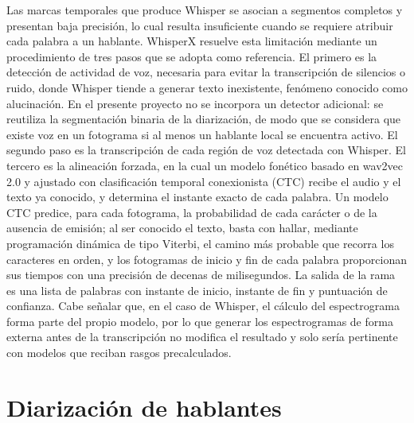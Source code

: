 \documentclass[11pt,a4paper]{article}
\begin{document}
Las marcas temporales que produce Whisper se asocian a segmentos completos y presentan baja precisión, lo cual resulta insuficiente cuando se requiere atribuir cada palabra a un hablante. WhisperX \cite{bain2023} resuelve esta limitación mediante un procedimiento de tres pasos que se adopta como referencia. El primero es la detección de actividad de voz, necesaria para evitar la transcripción de silencios o ruido, donde Whisper tiende a generar texto inexistente, fenómeno conocido como alucinación. En el presente proyecto no se incorpora un detector adicional: se reutiliza la segmentación binaria de la diarización, de modo que se considera que existe voz en un fotograma si al menos un hablante local se encuentra activo. El segundo paso es la transcripción de cada región de voz detectada con Whisper. El tercero es la alineación forzada, en la cual un modelo fonético basado en wav2vec 2.0 \cite{baevski2020} y ajustado con clasificación temporal conexionista (CTC) recibe el audio y el texto ya conocido, y determina el instante exacto de cada palabra. Un modelo CTC predice, para cada fotograma, la probabilidad de cada carácter o de la ausencia de emisión; al ser conocido el texto, basta con hallar, mediante programación dinámica de tipo Viterbi, el camino más probable que recorra los caracteres en orden, y los fotogramas de inicio y fin de cada palabra proporcionan sus tiempos con una precisión de decenas de milisegundos. La salida de la rama es una lista de palabras con instante de inicio, instante de fin y puntuación de confianza. Cabe señalar que, en el caso de Whisper, el cálculo del espectrograma forma parte del propio modelo, por lo que generar los espectrogramas de forma externa antes de la transcripción no modifica el resultado y solo sería pertinente con modelos que reciban rasgos precalculados.

\section{Diarización de hablantes}
\label{sec:diar}
\end{document}
